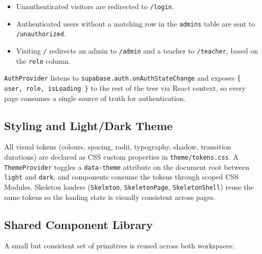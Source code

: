 \begin{itemize}[leftmargin=2em]
  \item Unauthenticated visitors are redirected to \texttt{/login}.
  \item Authenticated users without a matching row in the \texttt{admins} table are sent to \texttt{/unauthorized}.
  \item Visiting \texttt{/} redirects an admin to \texttt{/admin} and a teacher to \texttt{/teacher}, based on the \texttt{role} column.
\end{itemize}

\texttt{AuthProvider} listens to \texttt{supabase.auth.onAuthStateChange} and exposes \texttt{\{ user, role, isLoading \}} to the rest of the tree via React context, so every page consumes a single source of truth for authentication.

\subsection{Styling and Light/Dark Theme}

All visual tokens (colours, spacing, radii, typography, shadow, transition durations) are declared as CSS custom properties in \texttt{theme/tokens.css}. A \texttt{ThemeProvider} toggles a \texttt{data-theme} attribute on the document root between \texttt{light} and \texttt{dark}, and components consume the tokens through scoped CSS Modules. Skeleton loaders (\texttt{Skeleton}, \texttt{SkeletonPage}, \texttt{SkeletonShell}) reuse the same tokens so the loading state is visually consistent across pages.

\subsection{Shared Component Library}

A small but consistent set of primitives is reused across both workspaces:

